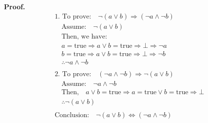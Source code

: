 \textbf{Proof.} \\[5pt]
\begin{align*}
	&\text{1. To prove:} \quad \neg (a \lor b) \Rightarrow (\neg a \land \neg b) \\
	&\quad \text{Assume:} \quad \neg (a \lor b) \\
	&\quad \text{Then, we have:} \\
	&\quad a = \text{true} \Rightarrow a \lor b = \text{true} \Rightarrow \bot \Rightarrow \neg a \\
	&\quad b = \text{true} \Rightarrow a \lor b = \text{true} \Rightarrow \bot \Rightarrow \neg b \\
	&\quad \therefore \neg a \land \neg b \\
	\\
	&\text{2. To prove:} \quad (\neg a \land \neg b) \Rightarrow \neg (a \lor b) \\
	&\quad \text{Assume:} \quad \neg a \land \neg b \\
	&\quad \text{Then,} \quad a \lor b = \text{true} \Rightarrow a = \text{true} \lor b = \text{true} \Rightarrow \bot \\
	&\quad \therefore \neg (a \lor b) \\
	\\
	&\text{Conclusion:} \quad \neg (a \lor b) \Leftrightarrow (\neg a \land \neg b)
\end{align*}
